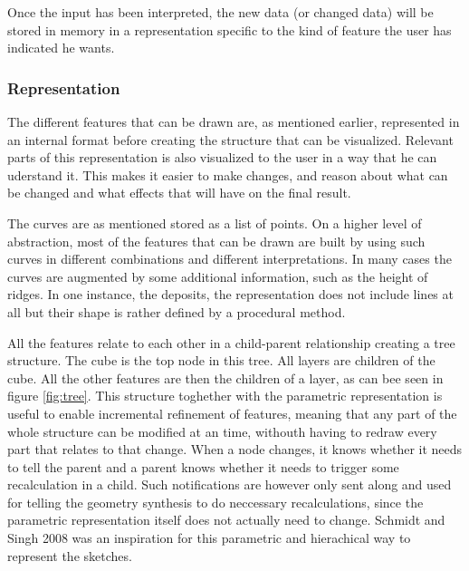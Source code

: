 \documentclass[a4paper,12pt]{article}
\begin{document}
Once the input has been interpreted, the new data (or changed data) will be stored in memory in a representation specific to the kind of feature the user has indicated he wants.

\subsubsection{Representation}
The different features that can be drawn are, as mentioned earlier, represented in an internal format before creating the structure that can be visualized. Relevant parts of this representation is also visualized to the user in a way that he can uderstand it. This makes it easier to make changes, and reason about what can be changed and what effects that will have on the final result.

The curves are as mentioned stored as a list of points. On a higher level of abstraction, most of the features that can be drawn are built by using such curves in different combinations and different interpretations. In many cases the curves are augmented by some additional information, such as the height of ridges. In one instance, the deposits, the representation does not include lines at all but their shape is rather defined by a procedural method.

All the features relate to each other in a child-parent relationship creating a tree structure. The cube is the top node in this tree. All layers are children of the cube. All the other features are then the children of a layer, as can bee seen in figure \ref{fig:tree}. This structure toghether with the parametric representation is useful to enable incremental refinement of features, meaning that any part of the whole structure can be modified at an time, withouth having to redraw every part that relates to that change. When a node changes, it knows whether it needs to tell the parent and a parent knows whether it needs to trigger some recalculation in a child. Such notifications are however only sent along and used for telling the geometry synthesis to do neccessary recalculations, since the parametric representation itself does not actually need to change. Schmidt and Singh 2008 \cite{CGF:CGF1129} was an inspiration for this parametric and hierachical way to represent the sketches.
\end{document}
